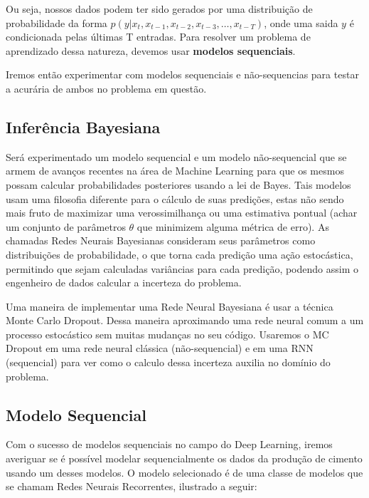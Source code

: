 Ou seja, nossos dados podem ter sido gerados por uma distribuição de probabilidade da forma $p(y | x_{t} ,x_{t -1},x_{t -2},x_{t-3} , \dots, x_{t-T})$, onde uma saida $y$ é condicionada pelas últimas T entradas. Para resolver um problema de aprendizado dessa natureza, devemos usar \textbf{modelos sequenciais}. 

Iremos então experimentar com modelos sequenciais e não-sequencias para testar a acurária de ambos no problema em questão.



\subsection{Inferência Bayesiana}

Será experimentado um modelo sequencial e um modelo não-sequencial que se armem de avanços recentes na área de Machine Learning para que os mesmos possam calcular probabilidades posteriores usando a lei de Bayes. Tais modelos usam uma filosofia diferente para o cálculo de suas predições, estas não sendo mais fruto de maximizar uma verossimilhança ou uma estimativa pontual (achar um conjunto de parâmetros $\theta$ que minimizem alguma métrica de erro). As chamadas Redes Neurais Bayesianas consideram seus parâmetros como distribuições de probabilidade, o que torna cada predição uma ação estocástica, permitindo que sejam calculadas variâncias para cada predição, podendo assim o engenheiro de dados calcular a incerteza do problema.

Uma maneira de implementar uma Rede Neural Bayesiana é usar a técnica Monte Carlo Dropout. Dessa maneira aproximando uma rede neural comum a um processo estocástico sem muitas mudanças no seu código. Usaremos o MC Dropout em uma rede neural clássica (não-sequencial) e em uma RNN (sequencial) para ver como o calculo dessa incerteza auxilia no domínio do problema.

\subsection{Modelo Sequencial}
Com o sucesso de modelos sequenciais no campo do Deep Learning, iremos averiguar se é possível modelar sequencialmente os dados da produção de cimento usando um desses modelos. O modelo selecionado é de uma classe de modelos que se chamam Redes Neurais Recorrentes, ilustrado a seguir:
\\


% 

